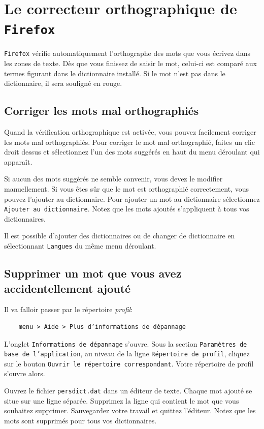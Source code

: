 \documentclass[a4paper,11pt]{book}
\begin{document}
\section{Le correcteur orthographique de \texttt{Firefox}}
\texttt{Firefox} vérifie automatiquement l’orthographe des mots que vous écrivez dans les zones de texte. Dès que vous finissez de saisir le mot, celui-ci est comparé aux termes figurant dans le dictionnaire installé. Si le mot n’est pas dans le dictionnaire, il sera souligné en rouge.
\medskip

\subsection*{Corriger les mots mal orthographiés}
Quand la vérification orthographique est activée, vous pouvez facilement corriger les mots mal orthographiés. Pour corriger le mot mal orthographié, faites un clic droit dessus et sélectionnez l’un des mots suggérés en haut du menu déroulant qui apparaît.
\medskip

Si aucun des mots suggérés ne semble convenir, vous devez le modifier manuellement. Si vous êtes sûr que le mot est orthographié correctement, vous pouvez l’ajouter au dictionnaire. Pour ajouter un mot au dictionnaire sélectionnez \texttt{Ajouter au dictionnaire}. Notez que les mots ajoutés s’appliquent à tous vos dictionnaires.
\medskip

Il est possible d'ajouter des dictionnaires ou de changer de dictionnaire en sélectionnant \texttt{Langues} du même menu déroulant.
\medskip

\subsection*{Supprimer un mot que vous avez accidentellement ajouté}
Il va falloir passer par le répertoire \textit{profil}:
\begin{verbatim}
    menu > Aide > Plus d’informations de dépannage
\end{verbatim}
\medskip

L’onglet \texttt{Informations de dépannage} s’ouvre. Sous la section \texttt{Paramètres de base de l’application}, au niveau de la ligne \texttt{Répertoire de profil}, cliquez sur le bouton \texttt{Ouvrir le répertoire correspondant}. Votre répertoire de profil s’ouvre alors.
\medskip

Ouvrez le fichier \texttt{persdict.dat} dans un éditeur de texte. Chaque mot ajouté se situe sur une ligne séparée. Supprimez la ligne qui contient le mot que vous souhaitez supprimer. Sauvegardez votre travail et quittez l'éditeur. Notez  que les mots sont supprimés pour tous vos dictionnaires.
\medskip
 
\end{document}
